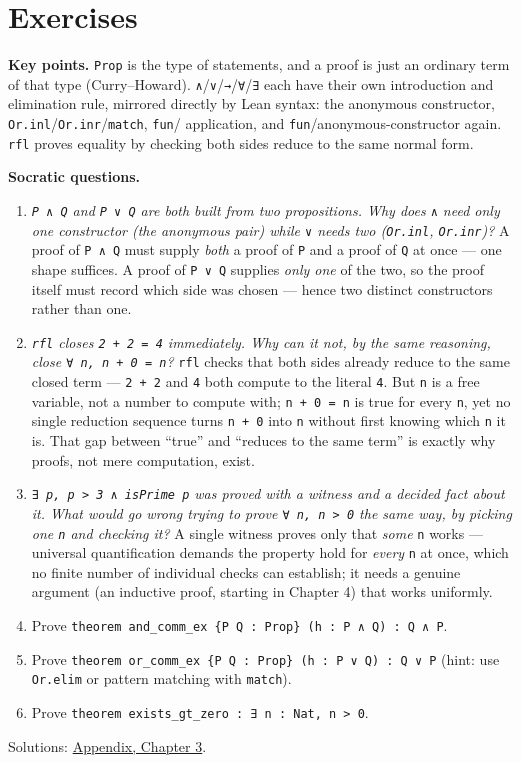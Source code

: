 \section{Exercises}\label{sec:03-propositions-and-proofs:08-exercises:1}

\textbf{Key points.} \texttt{Prop} is the type of statements, and a proof is just an ordinary term of that type (Curry--Howard). \texttt{∧}/\texttt{∨}/\texttt{→}/\texttt{∀}/\texttt{∃} each have their own introduction and elimination rule, mirrored directly by Lean syntax: the anonymous constructor, \texttt{Or.inl}/\texttt{Or.inr}/\texttt{match}, \texttt{fun}/ application, and \texttt{fun}/anonymous-constructor again. \texttt{rfl} proves equality by checking both sides reduce to the same normal form.

\textbf{Socratic questions.}

\begin{enumerate}
\def\labelenumi{\arabic{enumi}.}
\item
  \emph{\texttt{P ∧ Q} and \texttt{P ∨ Q} are both built from two propositions. Why does \texttt{∧} need only one constructor (the anonymous pair) while \texttt{∨} needs two (\texttt{Or.inl}, \texttt{Or.inr})?} A proof of \texttt{P ∧ Q} must supply \emph{both} a proof of \texttt{P} and a proof of \texttt{Q} at once --- one shape suffices. A proof of \texttt{P ∨ Q} supplies \emph{only one} of the two, so the proof itself must record which side was chosen --- hence two distinct constructors rather than one.
\item
  \emph{\texttt{rfl} closes \texttt{2 + 2 = 4} immediately. Why can it not, by the same reasoning, close \texttt{∀ n, n + 0 = n}?} \texttt{rfl} checks that both sides already reduce to the same closed term --- \texttt{2 + 2} and \texttt{4} both compute to the literal \texttt{4}. But \texttt{n} is a free variable, not a number to compute with; \texttt{n + 0 = n} is true for every \texttt{n}, yet no single reduction sequence turns \texttt{n + 0} into \texttt{n} without first knowing which \texttt{n} it is. That gap between ``true'' and ``reduces to the same term'' is exactly why proofs, not mere computation, exist.
\item
  \emph{\texttt{∃ p, p > 3 ∧ isPrime p} was proved with a witness and a decided fact about it. What would go wrong trying to prove \texttt{∀ n, n > 0} the same way, by picking one \texttt{n} and checking it?} A single witness proves only that \emph{some} \texttt{n} works --- universal quantification demands the property hold for \emph{every} \texttt{n} at once, which no finite number of individual checks can establish; it needs a genuine argument (an inductive proof, starting in Chapter 4) that works uniformly.
\item
  Prove \texttt{theorem and\_\allowbreak{}comm\_\allowbreak{}ex \{P Q : Prop\} (h : P ∧ Q) : Q ∧ P}.
\item
  Prove \texttt{theorem or\_\allowbreak{}comm\_\allowbreak{}ex \{P Q : Prop\} (h : P ∨ Q) : Q ∨ P} (hint: use \texttt{Or.elim} or pattern matching with \texttt{match}).
\item
  Prove \texttt{theorem exists\_\allowbreak{}gt\_\allowbreak{}zero : ∃ n : Nat, n > 0}.
\end{enumerate}

Solutions: \hyperref[sec:14-appendix-solutions:02-chapter-3:1]{Appendix, Chapter 3}.

